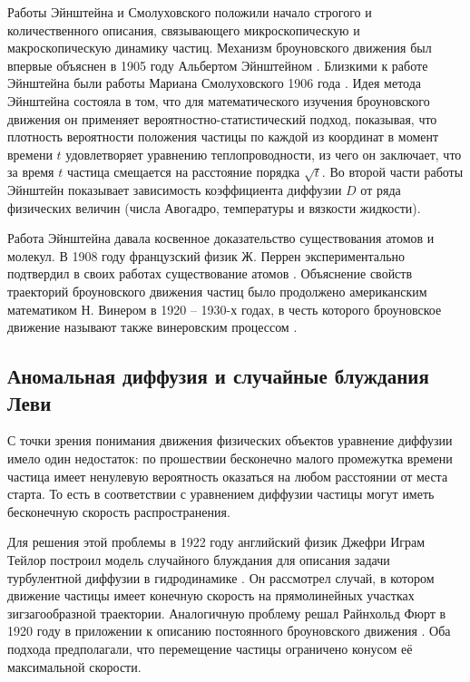Работы Эйнштейна и Смолуховского положили начало строгого и количественного описания, связывающего микроскопическую и макроскопическую динамику частиц. Механизм броуновского движения был впервые объяснен в 1905 году Альбертом Эйнштейном \cite{einstein_uber_1905}. Близкими к работе Эйнштейна были работы Мариана Смолуховского 1906 года \cite{vonsmoluchowski_zur_1906}. Идея метода Эйнштейна состояла в том, что для математического изучения броуновского движения он применяет вероятностно-статистический подход, показывая, что плотность вероятности положения частицы по каждой из координат в момент времени $t$ удовлетворяет уравнению теплопроводности, из чего он заключает, что за время $t$ частица смещается на расстояние порядка $\sqrt{t}$. Во второй части работы Эйнштейн показывает зависимость коэффициента диффузии $D$ от ряда физических величин (числа Авогадро, температуры и вязкости жидкости).

Работа Эйнштейна давала косвенное доказательство существования атомов и молекул. В 1908 году французский физик Ж. Перрен экспериментально подтвердил в своих работах существование атомов \cite{perrin_atomes_1921}. Объяснение свойств траекторий броуновского движения частиц было продолжено американским математиком Н. Винером в 1920 – 1930-х годах, в честь которого броуновское движение называют также винеровским процессом \cite{wiener_average_1921a}.

\subsection{Аномальная диффузия и случайные блуждания Леви}\label{subsec:ch1/sec2/sub2}

С точки зрения понимания движения физических объектов уравнение диффузии имело один недостаток: по прошествии бесконечно малого промежутка времени частица имеет ненулевую вероятность оказаться на любом расстоянии от места старта. То есть в соответствии с уравнением диффузии частицы могут иметь бесконечную скорость распространения.

Для решения этой проблемы в 1922 году английский физик Джефри Играм Тейлор построил модель случайного блуждания для описания задачи турбулентной диффузии в гидродинамике \cite{taylor_diffusion_1922}. Он рассмотрел случай, в котором движение частицы имеет конечную скорость на прямолинейных участках зигзагообразной траектории. Аналогичную проблему решал Райнхольд Фюрт в 1920 году в приложении к описанию постоянного броуновского движения \cite{furth_zur_1920}. Оба подхода предполагали, что перемещение частицы ограничено конусом её максимальной скорости.

